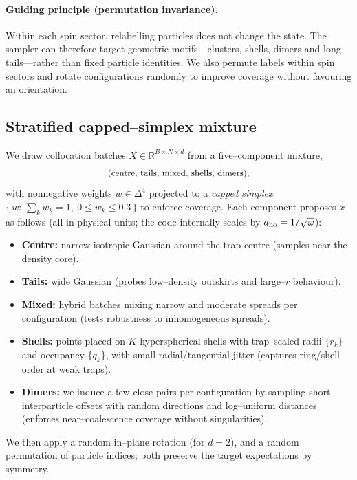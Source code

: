 \paragraph{Guiding principle (permutation invariance).}
Within each spin sector, relabelling particles does not change the state. The sampler can
therefore target geometric motifs---clusters, shells, dimers and long tails---rather than
fixed particle identities. We also permute labels within spin sectors and rotate configurations
randomly to improve coverage without favouring an orientation.

\subsection{Stratified capped–simplex mixture}
We draw collocation batches $X\in\mathbb{R}^{B\times N\times d}$ from a five–component mixture,
\[
\text{\small(centre, tails, mixed, shells, dimers)},
\]
with nonnegative weights $w\in\Delta^4$ projected to a \emph{capped simplex} $\{\,w:\, \sum_k w_k=1,\ 0\le w_k\le 0.3\,\}$ to enforce coverage.
Each component proposes $x$ as follows (all in physical units; the code internally scales by $a_{\rm ho}=1/\sqrt{\omega}$):
\begin{itemize}
  \item \textbf{Centre:} narrow isotropic Gaussian around the trap centre (samples near the density core).
  \item \textbf{Tails:} wide Gaussian (probes low–density outskirts and large–$r$ behaviour).
  \item \textbf{Mixed:} hybrid batches mixing narrow and moderate spreads per configuration (tests robustness to inhomogeneous spreads).
  \item \textbf{Shells:} points placed on $K$ hyperspherical shells with trap–scaled radii $\{r_k\}$ and occupancy $\{q_k\}$, with small radial/tangential jitter (captures ring/shell order at weak traps).
  \item \textbf{Dimers:} we induce a few close pairs per configuration by sampling short interparticle offsets with random directions and log–uniform distances (enforces near–coalescence coverage without singularities).
\end{itemize}
We then apply a random in–plane rotation (for $d=2$), and a random permutation of particle indices; both preserve the target expectations by symmetry.

